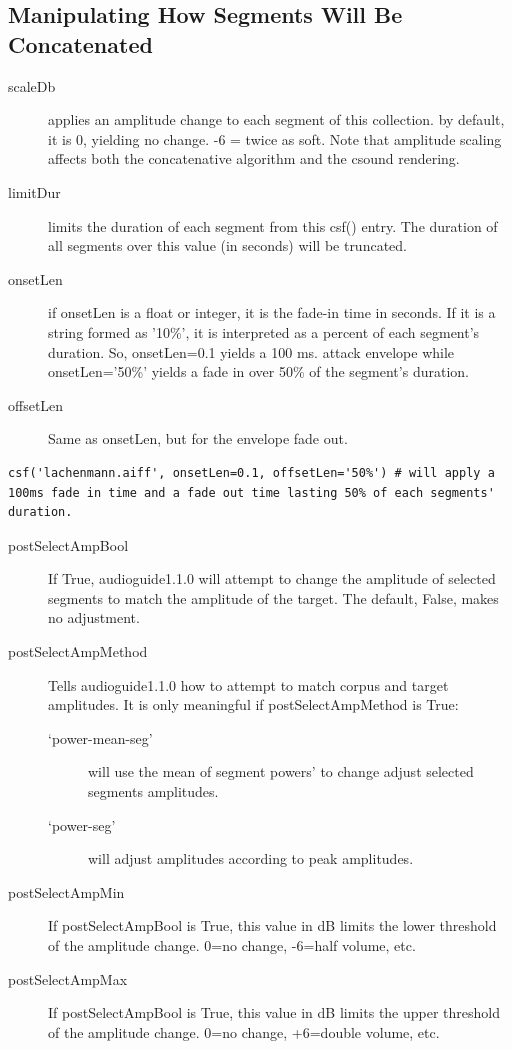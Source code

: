 \documentclass{article}
\newcommand{\ag}{audioguide1.1.0\xspace}
\begin{document}
\begin{spacing}{1.2}
\subsection{Manipulating How Segments Will Be Concatenated}
\begin{description}
\item[scaleDb] applies an amplitude change to each segment of this collection. by default, it is 0, yielding no change. -6 = twice as soft.  Note that amplitude scaling affects both the concatenative algorithm and the csound rendering.  

\item[limitDur] limits the duration of each segment from this csf() entry.  The duration of all segments over this value (in seconds) will be truncated.  

\item[onsetLen] if onsetLen is a float or integer, it is the fade-in time in seconds.  If it is a string formed as '10\%', it is interpreted as a percent of each segment's duration.  So, onsetLen=0.1 yields a 100 ms. attack envelope while onsetLen='50\%' yields a fade in over 50\% of the segment's duration.

\item[offsetLen] Same as onsetLen, but for the envelope fade out.

\end{description}
\begin{lstlisting}
csf('lachenmann.aiff', onsetLen=0.1, offsetLen='50%') # will apply a 100ms fade in time and a fade out time lasting 50% of each segments' duration.
\end{lstlisting}
\begin{description}

\item[postSelectAmpBool] If True, \ag will attempt to change the amplitude of selected segments to match the amplitude of the target.  The default, False, makes no adjustment.
\item[postSelectAmpMethod] Tells \ag how to attempt to match corpus and target amplitudes.  It is only meaningful if postSelectAmpMethod is True:
\begin{description}
\item[`power-mean-seg'] will use the mean of segment powers' to change adjust selected segments amplitudes.  
\item[`power-seg'] will adjust amplitudes according to peak amplitudes.  
\end{description}
\item[postSelectAmpMin] If postSelectAmpBool is True, this value in dB limits the lower threshold of the amplitude change.  0=no change, -6=half volume, etc.
\item[postSelectAmpMax] If postSelectAmpBool is True, this value in dB limits the upper threshold of the amplitude change.  0=no change, +6=double volume, etc.


\end{description}
\end{spacing}
\end{document}
